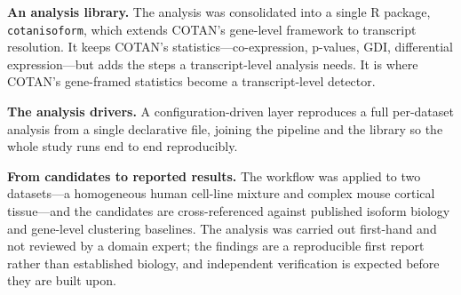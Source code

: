 \textbf{An analysis library.} The analysis was consolidated into a single R package, \texttt{cotanisoform}, which extends COTAN's gene-level framework to transcript resolution. It keeps COTAN's statistics---co-expression, p-values, GDI, differential expression---but adds the steps a transcript-level analysis needs. It is where COTAN's gene-framed statistics become a transcript-level detector.

\textbf{The analysis drivers.} A configuration-driven layer reproduces a full per-dataset analysis from a single declarative file, joining the pipeline and the library so the whole study runs end to end reproducibly.

\textbf{From candidates to reported results.} The workflow was applied to two datasets---a homogeneous human cell-line mixture and complex mouse cortical tissue---and the candidates are cross-referenced against published isoform biology and gene-level clustering baselines. The analysis was carried out first-hand and not reviewed by a domain expert; the findings are a reproducible first report rather than established biology, and independent verification is expected before they are built upon.

